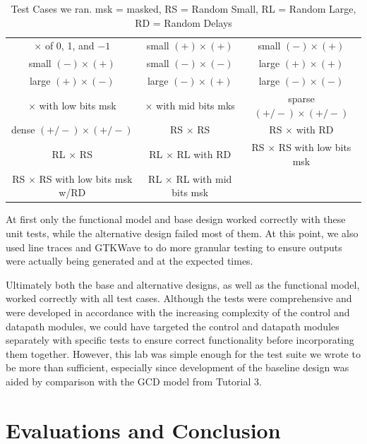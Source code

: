 \documentclass[11pt]{article}
\begin{document}
\begin{center}
\begin{table}[h]
\begin{tabular}{c | c | c}
$\times$ of 0, 1, and $-1$ & small $(+) \times (+)$ & small $(-) \times (+)$ \\
small $(-) \times (+)$ & small $(-) \times (-)$ & large $(+) \times (+)$      \\
large $(+) \times (-)$               &
large $(-) \times (+)$               &
large $(-) \times (-)$               \\
$\times$ with low bits msk              &
$\times$ with mid bits mks              &
sparse $(+/-) \times (+/-)$          \\
dense  $(+/-) \times (+/-)$          &
RS $\times$ RS                       &
RS $\times$ with RD                  \\
RL $\times$ RS                       &
RL $\times$ RL with RD                  &
RS $\times$ RS with low bits msk           \\
RS $\times$ RS with low bits msk w/RD      &
RL $\times$ RL with mid bits msk           &  \\
                                                 
\end{tabular}
\caption{Test Cases we ran. msk = masked, RS = Random Small, RL = Random Large, RD = Random Delays}
\end{table}
\end{center}

At first only the functional model and base design worked correctly with these unit tests, while the alternative design failed most of them. At this point, we also used line traces and GTKWave to do more granular testing to ensure outputs were actually being generated and at the expected times. 

Ultimately both the base and alternative designs, as well as the functional model, worked correctly with all test cases. Although the tests were comprehensive and were developed in accordance with the increasing complexity of the control and datapath modules, we could have targeted the control and datapath modules separately with specific tests to ensure correct functionality before incorporating them together. However, this lab was simple enough for the test suite we wrote to be more than sufficient, especially since development of the baseline design was aided by comparison with the GCD model from Tutorial 3. 


\section{Evaluations and Conclusion}
\end{document}
